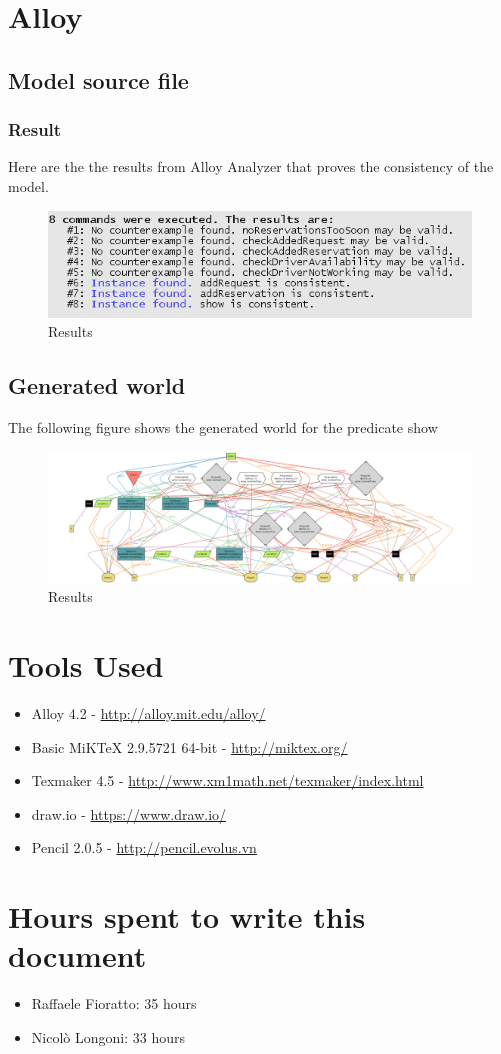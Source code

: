 \documentclass[a4paper,12pt,dvipsnames]{article}%
\begin{document}
\section{Alloy}
\subsection{Model source file}

\break
\subsubsection{Result}
Here are the the results from Alloy Analyzer that proves the consistency of the model.
\begin{figure}[H]
\centering
\includegraphics[scale=1]{alloy_result.png}
\caption{Results}
\end{figure}
\break
\begin{landscape}
\subsection{Generated world}
The following figure shows the generated world for the predicate show
\begin{figure}[H]
\centering
\includegraphics[scale=.3]{alloy_world.png}
\caption{Results}
\end{figure}
\end{landscape}
\break
\newpage
\section*{Tools Used}
\begin{itemize}
\item Alloy 4.2 - \url{http://alloy.mit.edu/alloy/}
\item Basic MiKTeX 2.9.5721 64-bit - \url{http://miktex.org/}
\item Texmaker 4.5 - \url{http://www.xm1math.net/texmaker/index.html}
\item draw.io - \url{https://www.draw.io/}
\item Pencil 2.0.5 - \url{http://pencil.evolus.vn}
\end{itemize}
\section*{Hours spent to write this document}
\begin{itemize}
\item Raffaele Fioratto: 35 hours
\item Nicol\`{o} Longoni: 33 hours
\end{itemize}
\end{document}
